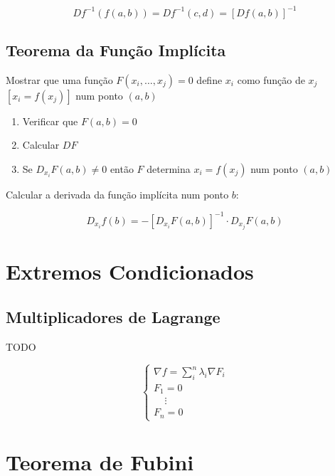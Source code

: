 \documentclass[11pt, a4paper]{article}
\begin{document}
\begin{equation*}
    Df^{-1}\left(f(a, b)\right) = Df^{-1}(c, d) = \left[Df(a, b)\right]^{-1}
\end{equation*}

\subsection{Teorema da Função Implícita}

Mostrar que uma função $F(x_i, \ldots, x_j) = 0$ define $x_i$ como função de $x_j$ $\left[x_i = f(x_j)\right]$ num ponto $(a, b)$

\begin{enumerate}
    \item Verificar que $F(a, b) = 0$
    \item Calcular $DF$
    \item Se $D_{x_i}F(a, b) \ne 0$ então $F$ determina
          $x_i = f(x_j)$ num ponto $(a, b)$
\end{enumerate}

Calcular a derivada da função implícita num ponto $b$:

\begin{equation*}
    D_{x_i}f (b) = - \left[D_{x_i}F(a, b)\right]^{-1} \cdot D_{x_j}F(a, b)
\end{equation*}

\section{Extremos Condicionados}

\subsection{Multiplicadores de Lagrange}

TODO

\begin{equation*}
    \begin{cases}
        \nabla f = \sum_{i}^{n} \lambda_i \nabla F_i \\
        F_1 = 0                                      \\
        \ \ \ \ \ \vdots                             \\
        F_n = 0
    \end{cases}
\end{equation*}

\section{Teorema de Fubini}
\end{document}
